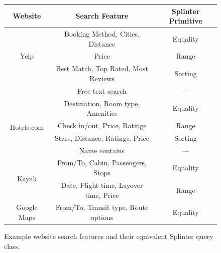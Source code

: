 

\begin{figure}
	\centering
		\begin{tabular}{c|c|c}
			\toprule
			\bf Website & \bf Search Feature & \bf Splinter Primitive \\
			\midrule
			\multirow{3}{*}{Yelp} & Booking Method, Cities, Distance & Equality \\
			& Price & Range \\
			& Best Match, Top Rated, Most Reviews & Sorting \\
			& Free text search & --- \\
			\midrule
			\multirow{4}{*}{Hotels.com} & Destination, Room type, Amenities & Equality \\
			& Check in/out, Price, Ratings & Range \\
			& Stars, Distance, Ratings, Price & Sorting \\
			& Name contains & --- \\
			\midrule
			\multirow{2}{*}{Kayak} & From/To, Cabin, Passengers, Stops & Equality \\
			& Date, Flight time, Layover time, Price & Range \\
			\midrule
			Google Maps & From/To, Transit type, Route options & Equality \\
			\bottomrule
		\end{tabular}
	\caption{Example website search features and their equivalent Splinter query class.}
	\label{fig:websites}
\end{figure}

